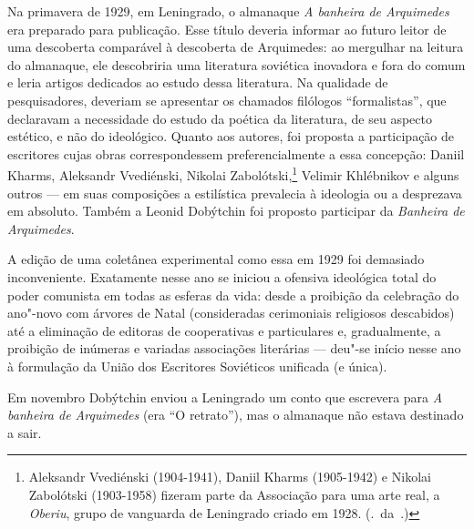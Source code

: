 \movetooddpage
\pagebreak
\begin{center}
{}
\end{center}
\label{prefacio}


Na primavera de 1929, em Leningrado, o almanaque \emph{A banheira de
Arquimedes} era preparado para publicação. Esse título deveria informar
ao futuro leitor de uma descoberta comparável à descoberta de
Arquimedes: ao mergulhar na leitura do almanaque, ele descobriria uma
literatura soviética inovadora e fora do comum e leria artigos dedicados
ao estudo dessa literatura. Na qualidade de pesquisadores, deveriam se
apresentar os chamados filólogos ``formalistas'', que declaravam a
necessidade do estudo da poética da literatura, de seu aspecto estético,
e não do ideológico. Quanto aos autores, foi proposta a participação de
escritores cujas obras correspondessem preferencialmente a essa
concepção: Daniil Kharms, Aleksandr Vvediénski, Nikolai Zabolótski,\footnote{Aleksandr Vvediénski (1904-1941), Daniil Kharms (1905-1942) e Nikolai Zabolótski (1903-1958) fizeram parte da Associação para uma arte real, a \emph{Oberiu}, grupo de vanguarda de Leningrado criado em 1928. (\scalebox{.8}{N}.~da~\scalebox{.8}{E}.)}
Velimir Khlébnikov e alguns outros --- em suas composições a estilística
prevalecia à ideologia ou a desprezava em absoluto. Também a Leonid
Dobýtchin foi proposto participar da \emph{Banheira de Arquimedes}.

A edição de uma coletânea experimental como essa em 1929 foi demasiado
inconveniente. Exatamente nesse ano se iniciou a ofensiva ideológica
total do poder comunista em todas as esferas da vida: desde a proibição
da celebração do ano"-novo com árvores de Natal (consideradas cerimoniais
religiosos descabidos) até a eliminação de editoras de cooperativas e
particulares e, gradualmente, a proibição de inúmeras e variadas
associações literárias --- deu"-se início nesse ano à formulação da
União dos Escritores Soviéticos unificada (e única).

Em novembro Dobýtchin enviou a Leningrado um conto que escrevera para
\emph{A banheira de Arquimedes} (era ``O retrato''), mas o almanaque não
estava destinado a sair.

